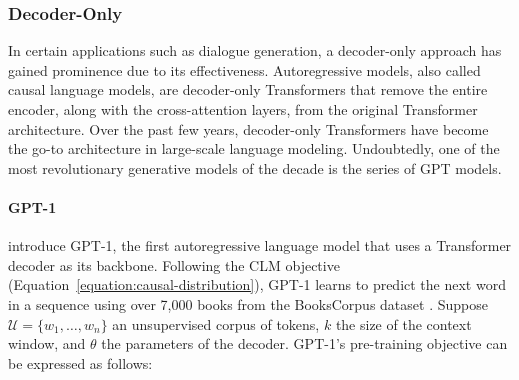 

\subsubsection{Decoder-Only}

In certain applications such as dialogue generation, a decoder-only approach has gained prominence due to its effectiveness. Autoregressive models, also called causal language models, are decoder-only Transformers that remove the entire encoder, along with the cross-attention layers, from the original Transformer architecture. Over the past few years, decoder-only Transformers have become the go-to architecture in large-scale language modeling. Undoubtedly, one of the most revolutionary generative models of the decade is the series of \ac{GPT} \citep{radford2018improving} models.


\paragraph{GPT-1}

\citet{radford2018improving} introduce \ac{GPT}-1, the first autoregressive language model that uses a Transformer decoder as its backbone. Following the \ac{CLM} objective (Equation~\ref{equation:causal-distribution}), \ac{GPT}-1 learns to predict the next word in a sequence using over 7,000 books from the BooksCorpus dataset \citep{zhu2015aligning}. Suppose $\mathcal{U} = \{w_1, \ldots, w_n\}$ an unsupervised corpus of tokens, $k$ the size of the context window, and $\theta$ the parameters of the decoder. \ac{GPT}-1's pre-training objective can be expressed as follows:


